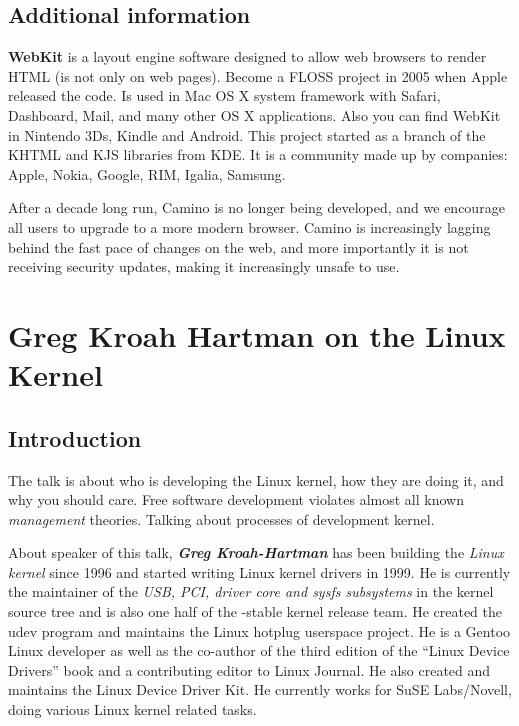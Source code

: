 \documentclass[11pt]{article}
\begin{document}
\subsection{Additional information}

\textbf{WebKit} is a layout engine software designed to allow web browsers to render HTML (is not only on web pages). Become a FLOSS project in 2005 when Apple released the code. Is used in Mac OS X system framework with Safari, Dashboard, Mail, and many other OS X applications. Also you can find WebKit in Nintendo 3Ds, Kindle and Android. This project started as a branch of the KHTML and KJS libraries from KDE. It is a community made up by companies: Apple, Nokia, Google, RIM, Igalia, Samsung.

After a decade long run, Camino is no longer being developed, and we encourage all users to upgrade to a more modern browser. Camino is increasingly lagging behind the fast pace of changes on the web, and more importantly it is not receiving security updates, making it increasingly unsafe to use.

\newpage


\section{Greg Kroah Hartman on the Linux Kernel}

\subsection{Introduction}
The talk is about who is developing the Linux kernel, how they are doing it, and why you should care. Free software development violates almost all known \emph{management} theories. Talking about processes of development kernel.

About speaker of this talk, \textbf{\emph{Greg Kroah-Hartman}} has been building the \emph{Linux kernel} since 1996 and started writing Linux kernel drivers in 1999. He is currently the maintainer of the \emph{USB, PCI, driver core and sysfs subsystems} in the kernel source tree and is also one half of the -stable kernel release team. He created the udev program and maintains the Linux hotplug userspace project. He is a Gentoo Linux developer as well as the co-author of the third edition of the ``Linux Device Drivers'' book and a contributing editor to Linux Journal. He also created and maintains the Linux Device Driver Kit. He currently works for SuSE Labs/Novell, doing various Linux kernel related tasks. 
\end{document}
